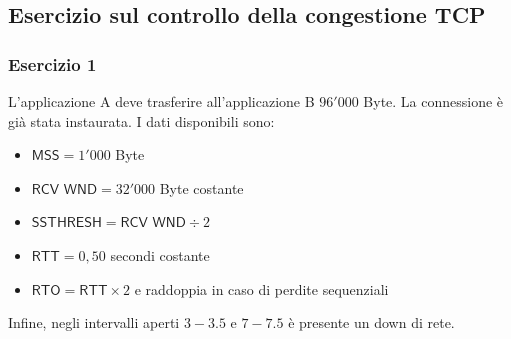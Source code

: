 \documentclass[a4paper]{article}
\begin{document}
	\subsection{\textcolor{Red3}{Esercizio sul controllo della congestione TCP}}
	
	\subsubsection{\textcolor{Red3}{Esercizio 1}}
	
	L’applicazione A deve trasferire all’applicazione B $96'000$ Byte. La connessione è già stata instaurata. I dati disponibili sono:
	\begin{itemize}
		\item $\textsf{MSS} = 1'000$ Byte
		\item $\textsf{RCV WND} = 32'000$ Byte costante
		\item $\textsf{SSTHRESH} = \textsf{RCV WND} \div 2$
		\item $\textsf{RTT} = 0,50$ secondi costante
		\item $\textsf{RTO} = \textsf{RTT} \times 2$ e raddoppia in caso di perdite sequenziali
	\end{itemize}
	Infine, negli intervalli aperti $3 - 3.5$ e $7 - 7.5$ è presente un down di rete.\newline
	
\end{document}
